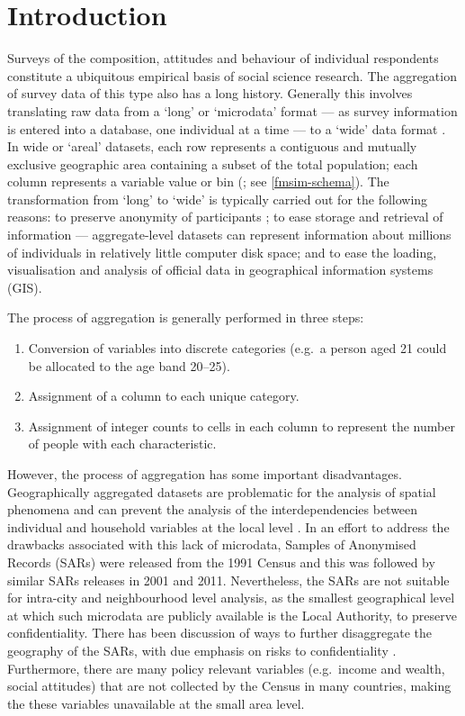 \documentclass[a4paper,10pt]{article}
\begin{document}
\section{Introduction}
Surveys of the composition, attitudes and behaviour of individual
respondents constitute a ubiquitous empirical basis of social science research.
The aggregation of survey data of this type also has a long history.
Generally this involves translating raw data from a `long' or `microdata' format
--- as survey information is entered into a database,
one individual at a time ---
to a `wide' data format \citep{van2012flexible}. In wide or `areal' datasets,
each row represents a contiguous and mutually exclusive geographic area
containing a subset of the total population; each column represents a
variable value or bin (\citealp{Openshaw1983}; see \cref{fmsim-schema}).
The transformation from `long' to `wide' is typically carried out
for the following reasons: to preserve anonymity of participants \citep{Lee2009,marsh1993};
to ease storage and retrieval of information ---
 aggregate-level datasets can represent information about millions of individuals
in relatively little computer disk space; and to ease the loading, visualisation and
 analysis of official data in geographical information systems (GIS).

The process of aggregation is generally performed in three steps:  %
\begin{enumerate}
 \item Conversion of
variables into discrete categories (e.g.~a person aged 21
could be allocated to the age band 20--25).
 \item Assignment of a column to each unique category.
 \item Assignment of
integer counts to cells in each column to represent the number of people with each characteristic.
\end{enumerate}

However, the process of aggregation has some important disadvantages.
Geographically aggregated datasets are problematic for the
analysis of spatial phenomena \citep{Openshaw1984} and can prevent the analysis of
the interdependencies between individual and household variables
at the local level \citep{Lee2009}. In an effort to address the drawbacks associated with this lack of microdata,
Samples of Anonymised Records (SARs) were released from the 1991 Census
\citep{marsh1993,middleton1995samples} and this was followed by similar SARs releases in 2001 and 2011.
Nevertheless, the SARs are not suitable for intra-city and neighbourhood level
analysis, as the smallest geographical level at which such microdata are publicly
available is the Local Authority, to preserve confidentiality.
There has been discussion of ways to further disaggregate the geography
of the SARs, with due emphasis on risks to confidentiality \citep{Tranmer2005case4}.
Furthermore, there are many policy relevant variables (e.g.~income and wealth,
social attitudes) that are not collected by the Census in many countries,
making the these variables
unavailable at the small area level.
\end{document}
